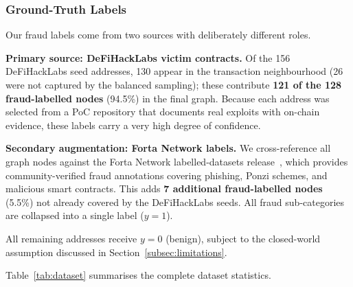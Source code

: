 \subsubsection{Ground-Truth Labels}
\label{subsubsec:labels}

Our fraud labels come from two sources with deliberately different roles.

\textbf{Primary source: DeFiHackLabs victim contracts.}
Of the 156 DeFiHackLabs seed addresses, 130 appear in the transaction
neighbourhood (26 were not captured by the balanced sampling); these
contribute \textbf{121 of the 128 fraud-labelled nodes} (94.5\%) in the
final graph.  Because each address was selected from a PoC repository that
documents real exploits with on-chain evidence, these labels carry a very
high degree of confidence.

\textbf{Secondary augmentation: Forta Network labels.}
We cross-reference all graph nodes against the Forta Network labelled-datasets
release~\cite{fortalabels}, which provides community-verified fraud
annotations covering phishing, Ponzi schemes, and malicious smart
contracts.  This adds \textbf{7 additional fraud-labelled nodes} (5.5\%)
not already covered by the DeFiHackLabs seeds.  All fraud sub-categories
are collapsed into a single label ($y=1$).

All remaining addresses receive $y=0$ (benign), subject to the
closed-world assumption discussed in Section~\ref{subsec:limitations}.

Table~\ref{tab:dataset} summarises the complete dataset statistics.

